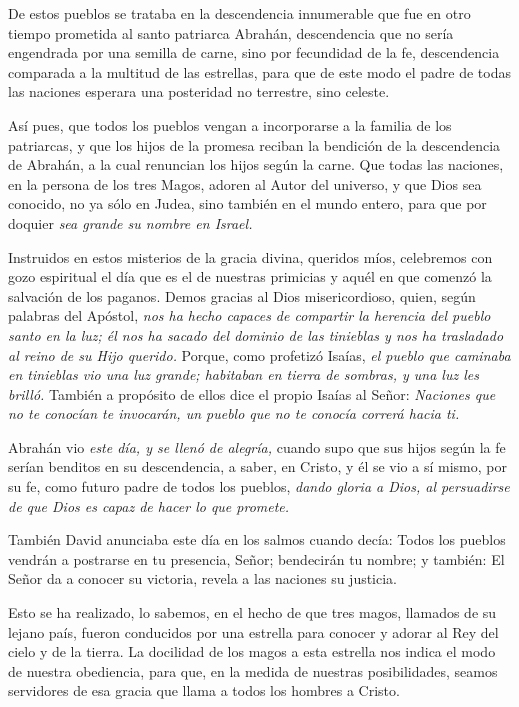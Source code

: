 \documentclass[]{article}
\begin{document}
De estos pueblos se trataba en la descendencia innumerable que fue en
otro tiempo prometida al santo patriarca Abrahán, descendencia que no
sería engendrada por una semilla de carne, sino por fecundidad de la fe,
descendencia comparada a la multitud de las estrellas, para que de este
modo el padre de todas las naciones esperara una posteridad no
terrestre, sino celeste.

Así pues, que todos los pueblos vengan a incorporarse a la familia de
los patriarcas, y que los hijos de la promesa reciban la bendición de la
descendencia de Abrahán, a la cual renuncian los hijos según la carne.
Que todas las naciones, en la persona de los tres Magos, adoren al Autor
del universo, y que Dios sea conocido, no ya sólo en Judea, sino también
en el mundo entero, para que por doquier \emph{sea grande su nombre en
Israel.}

Instruidos en estos misterios de la gracia divina, queridos míos,
celebremos con gozo espiritual el día que es el de nuestras primicias y
aquél en que comenzó la salvación de los paganos. Demos gracias al Dios
misericordioso, quien, según palabras del Apóstol, \emph{nos ha hecho
capaces de compartir la herencia del pueblo santo en la luz; él nos ha
sacado del dominio de las tinieblas y nos ha trasladado al reino de su
Hijo querido.} Porque, como profetizó Isaías, \emph{el pueblo que
caminaba en tinieblas vio una luz grande; habitaban en tierra de
sombras, y una luz les brilló.} También a propósito de ellos dice el
propio Isaías al Señor: \emph{Naciones que no te conocían te invocarán,
un pueblo que no te conocía correrá hacia ti.}

Abrahán vio \emph{este día, y se llenó de alegría,} cuando supo que sus
hijos según la fe serían benditos en su descendencia, a saber, en
Cristo, y él se vio a sí mismo, por su fe, como futuro padre de todos
los pueblos, \emph{dando gloria a Dios, al persuadirse de que Dios es
capaz de hacer lo que promete.}

También David anunciaba este día en los salmos cuando decía: Todos los
pueblos vendrán a postrarse en tu presencia, Señor; bendecirán tu
nombre; y también: El Señor da a conocer su victoria, revela a las
naciones su justicia.

Esto se ha realizado, lo sabemos, en el hecho de que tres magos,
llamados de su lejano país, fueron conducidos por una estrella para
conocer y adorar al Rey del cielo y de la tierra. La docilidad de los
magos a esta estrella nos indica el modo de nuestra obediencia, para
que, en la medida de nuestras posibilidades, seamos servidores de esa
gracia que llama a todos los hombres a Cristo.
\end{document}
